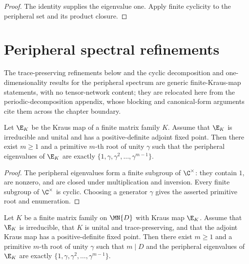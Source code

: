 \begin{proof}\leanok
    The identity supplies the eigenvalue one. Apply finite cyclicity to
    the peripheral set and its product closure.
\end{proof}

\section{Peripheral spectral refinements}%
\label{sec:peripheral_refinements}

The trace-preserving refinements below and the cyclic decomposition and
one-dimensionality results for the peripheral spectrum are generic
finite-Kraus-map statements, with no tensor-network content; they are
relocated here from the periodic-decomposition appendix, whose blocking and
canonical-form arguments cite them across the chapter boundary.

\begin{theorem}
    \label{thm:transfer_peripheral_cyclic_structure}
    \leanok
    Let $\E_K$ be the Kraus map of a finite matrix family $K$. Assume that
    $\E_K$ is irreducible and unital and has a positive-definite adjoint fixed
    point. Then there exist $m\geq1$ and a primitive $m$-th root of unity
    $\gamma$ such that the peripheral eigenvalues of $\E_K$ are exactly
    $\{1,\gamma,\gamma^2,\ldots,\gamma^{m-1}\}$.
\end{theorem}

\begin{proof}
    \leanok
    The peripheral eigenvalues form a finite subgroup of $\C^\times$: they
    contain $1$, are nonzero, and are closed under multiplication and
    inversion. Every finite subgroup of $\C^\times$ is cyclic. Choosing a
    generator $\gamma$ gives the asserted primitive root and enumeration.
\end{proof}

\begin{theorem}%
    \label{thm:peripheral_cyclic_group}
    \leanok
    Let $K$ be a finite matrix family on $\MN{D}$ with Kraus map $\E_K$.
    Assume that $\E_K$ is irreducible, that $K$ is unital and trace-preserving,
    and that the adjoint Kraus map has a positive-definite fixed point. Then
    there exist $m\geq1$ and a primitive $m$-th root of unity
    $\gamma$ such that $m\mid D$ and the peripheral eigenvalues of $\E_K$
    are exactly $\{1,\gamma,\gamma^2,\ldots,\gamma^{m-1}\}$.
\end{theorem}

